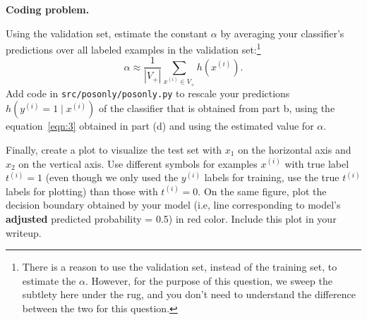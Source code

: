 \item {} \textbf{Coding problem.}

Using the validation set, estimate the constant $\alpha$ by averaging your
classifier's predictions over all labeled examples in the validation set:\footnote{There is a reason to use the validation set, instead of the training set, to estimate the $\alpha$. However, for the purpose of this question, we sweep the subtlety here under the rug, and you don't need to understand the difference between the two for this question. } 
%
\begin{equation*}
  \alpha \approx \frac{1}{|V_{+}|}\sum_{x^{(i)}\in V_{+}} h(x^{(i)}).
\end{equation*}
%
Add code in \texttt{src/posonly/posonly.py} to rescale your
 predictions $h(y^{(i)}=1\mid x^{(i)})$ of the classifier that is obtained from part b,  using the equation~\eqref{eqn:3} obtained in part (d) and using the estimated value for $\alpha$.



Finally, create a plot to visualize the test set with $x_1$ on the horizontal axis and $x_2$ on
the vertical axis. Use different symbols for examples $x^{(i)}$ with true label $t^{(i)} = 1$ (even though we only
used the $y^{(i)}$ labels for training, use the true $t^{(i)}$ labels for plotting)
than those with $t^{(i)} = 0$. On the same figure, plot the decision boundary obtained
by your model (i.e, line corresponding to model's \textbf{adjusted} predicted probability = 0.5) in red color. Include
this plot in your writeup.

